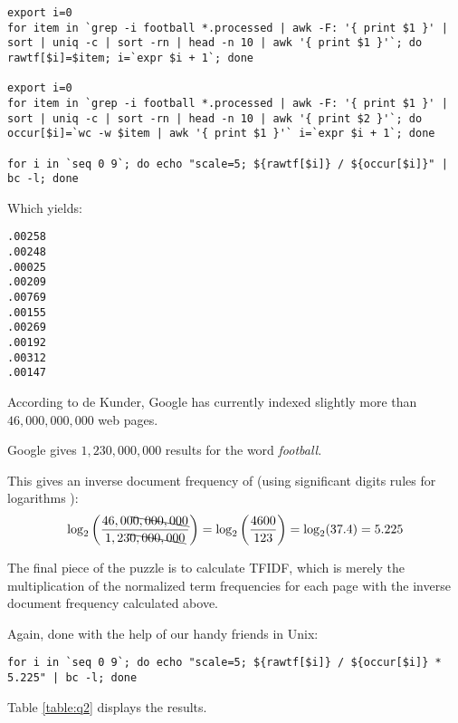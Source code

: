 \documentclass[letterpaper,11pt]{article}
\begin{document}
\begin{lstlisting}[frame=single]
export i=0
for item in `grep -i football *.processed | awk -F: '{ print $1 }' | sort | uniq -c | sort -rn | head -n 10 | awk '{ print $1 }'`; do rawtf[$i]=$item; i=`expr $i + 1`; done

export i=0
for item in `grep -i football *.processed | awk -F: '{ print $1 }' | sort | uniq -c | sort -rn | head -n 10 | awk '{ print $2 }'`; do occur[$i]=`wc -w $item | awk '{ print $1 }'` i=`expr $i + 1`; done

for i in `seq 0 9`; do echo "scale=5; ${rawtf[$i]} / ${occur[$i]}" | bc -l; done
\end{lstlisting}

Which yields:
\begin{lstlisting}[frame=single]
.00258
.00248
.00025
.00209
.00769
.00155
.00269
.00192
.00312
.00147
\end{lstlisting}

According to de Kunder, Google has currently indexed slightly more than $46,000,000,000$ web pages\cite{worldwidewebsize}.

Google gives $1,230,000,000$ results for the word \emph{football}.

This gives an inverse document frequency of (using significant digits rules for logarithms \cite{euler}):
\[
\log_2 \left( \frac{46,00\bcancel{0,000,000}}{1,23\bcancel{0,000,000}} \right) = \log_2 \left( \frac{4600}{123} \right) = \log_2 ( 37.4 ) =  5.225
\]

The final piece of the puzzle is to calculate TFIDF, which is merely the multiplication of the normalized term frequencies for each page with the inverse document frequency calculated above.

Again, done with the help of our handy friends in Unix:
\begin{lstlisting}[frame=single]
for i in `seq 0 9`; do echo "scale=5; ${rawtf[$i]} / ${occur[$i]} * 5.225" | bc -l; done
\end{lstlisting}

Table \ref{table:q2} displays the results.
\end{document}
